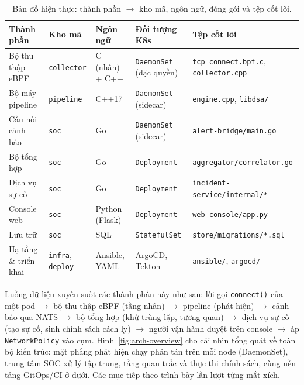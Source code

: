 \begin{table}[H]
  \centering
  \caption{Bản đồ hiện thực: thành phần $\rightarrow$ kho mã, ngôn ngữ, đóng gói và tệp cốt lõi.}
  \label{tab:impl-stack}
  \scriptsize
  \begin{tabularx}{\linewidth}{@{}l l l l X@{}}
    \toprule
    \textbf{Thành phần} & \textbf{Kho mã} & \textbf{Ngôn ngữ} & \textbf{Đối tượng K8s} & \textbf{Tệp cốt lõi} \\
    \midrule
    Bộ thu thập eBPF      & \texttt{collector} & C (nhân) + C++ & \texttt{DaemonSet} (đặc quyền) & \texttt{tcp\_connect.bpf.c}, \texttt{collector.cpp} \\
    Bộ máy pipeline       & \texttt{pipeline}  & C++17          & \texttt{DaemonSet} (sidecar)   & \texttt{engine.cpp}, \texttt{libdsa/} \\
    Cầu nối cảnh báo      & \texttt{soc}       & Go             & \texttt{DaemonSet} (sidecar)   & \texttt{alert-bridge/main.go} \\
    Bộ tổng hợp           & \texttt{soc}       & Go             & \texttt{Deployment}            & \texttt{aggregator/correlator.go} \\
    Dịch vụ sự cố         & \texttt{soc}       & Go             & \texttt{Deployment}            & \texttt{incident-service/internal/*} \\
    Console web           & \texttt{soc}       & Python (Flask) & \texttt{Deployment}            & \texttt{web-console/app.py} \\
    Lưu trữ               & \texttt{soc}       & SQL            & \texttt{StatefulSet}           & \texttt{store/migrations/*.sql} \\
    Hạ tầng \& triển khai & \texttt{infra}, \texttt{deploy} & Ansible, YAML & ArgoCD, Tekton & \texttt{ansible/}, \texttt{argocd/} \\
    \bottomrule
  \end{tabularx}
\end{table}

Luồng dữ liệu xuyên suốt các thành phần này như sau: lời gọi \texttt{connect()} của
một pod $\rightarrow$ bộ thu thập eBPF (tầng nhân) $\rightarrow$ pipeline (phát hiện)
$\rightarrow$ cảnh báo qua NATS $\rightarrow$ bộ tổng hợp (khử trùng lặp, tương quan)
$\rightarrow$ dịch vụ sự cố (tạo sự cố, sinh chính sách cách ly) $\rightarrow$ người
vận hành duyệt trên console $\rightarrow$ áp \texttt{NetworkPolicy} vào cụm.
Hình~\ref{fig:arch-overview} cho cái nhìn tổng quát về toàn bộ kiến trúc: mặt phẳng
phát hiện chạy phân tán trên mỗi node (DaemonSet), trung tâm SOC xử lý tập trung, tầng
quan trắc và thực thi chính sách, cùng nền tảng GitOps/CI ở dưới. Các mục tiếp theo
trình bày lần lượt từng mắt xích.


